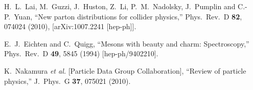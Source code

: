 \documentclass[aps,prc,preprint,superscriptaddress,showpacs,showkeys,amsmath]{revtex4-1}
\begin{document}
\begin{thebibliography}{100}
  H.~L.~Lai, M.~Guzzi, J.~Huston, Z.~Li, P.~M.~Nadolsky, J.~Pumplin and C.-P.~Yuan,
  ``New parton distributions for collider physics,''
  Phys.\ Rev.\ D {\bf 82}, 074024 (2010),
  [arXiv:1007.2241 [hep-ph]].

  E.~J.~Eichten and C.~Quigg,
  ``Mesons with beauty and charm: Spectroscopy,''
  Phys.\ Rev.\ D {\bf 49}, 5845 (1994)
  [hep-ph/9402210].



 





 
 

  K.~Nakamura {\it et al.}  [Particle Data Group Collaboration],
  ``Review of particle physics,''
  J.\ Phys.\ G {\bf 37}, 075021 (2010).



\end{thebibliography}
\end{document}
